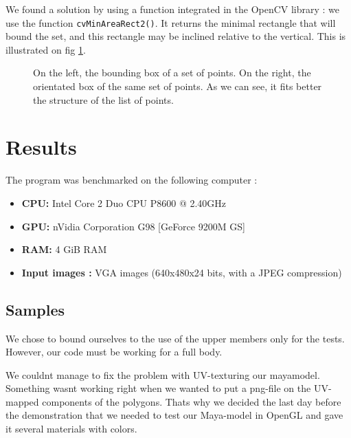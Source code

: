 \documentclass{article}
\newcommand{\imageWithoutFigure}[2] { \fbox {\imageWithoutFigureAndBox{#1}{#2} } }
\newcommand{\imageWithoutFigureAndBox}[2] { \texttt{[image: images/\#1]} }
\newcommand{\Figure}[3] { \begin{figure}[!ht] \centering{#1} \caption{#2 \label{#3} } \end{figure} }
\newcommand{\image}[4] { \Figure{\imageWithoutFigure{#1}{#2}} {#3} {#4} }
\begin{document}
We found a solution by using a function integrated in the OpenCV library :
we use the function \verb|cvMinAreaRect2()|.
It returns the minimal rectangle that will bound the set,
and this rectangle may be inclined relative to the vertical.
This is illustrated on fig \ref{fig:box2D}.

\image
    {box2D.png}{6}
    {On the left, the bounding box of a set of points.
    On the right, the orientated box of the same set of points. As we can see, it fits better the structure of the list of points.}
    {fig:box2D}

    \section{Results}



The program was benchmarked on the following computer :
\begin{itemize}
    \item \textbf{CPU:} Intel Core 2 Duo CPU P8600 @ 2.40GHz
    \item \textbf{GPU:} nVidia Corporation G98 [GeForce 9200M GS]
    \item \textbf{RAM:} 4 GiB RAM
    \item \textbf{Input images :} VGA images (640x480x24 bits, with a JPEG compression)
\end{itemize}

        \subsection{Samples}
We chose to bound ourselves to the use of the upper members only for the tests.
However, our code must be working for a full body.

We couldnt manage to fix the problem with UV-texturing our mayamodel. Something wasnt working right when we wanted to put a png-file on the UV-mapped components of the polygons. Thats why we decided the last day before the demonstration that we needed to test our Maya-model in OpenGL and gave it several materials with colors.
\end{document}
